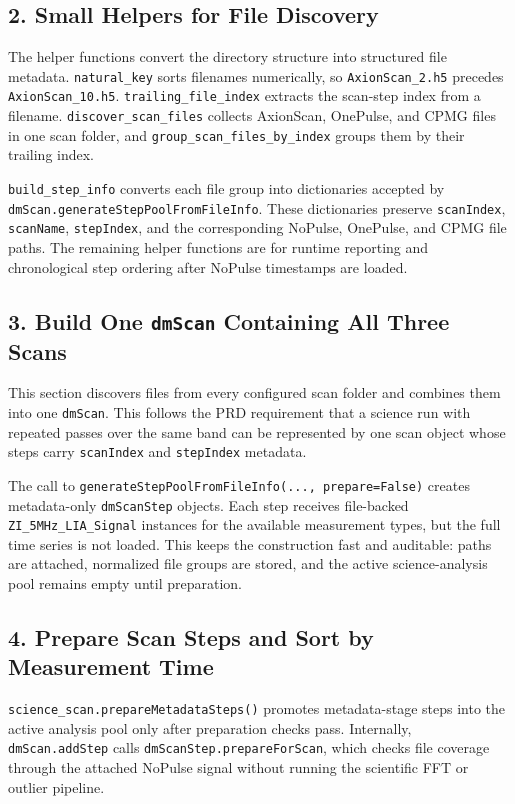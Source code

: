 \documentclass[11pt]{article}
\newcommand{\code}[1]{\texttt{#1}}
\begin{document}
\subsection{2. Small Helpers for File Discovery}

The helper functions convert the directory structure into structured file
metadata. \code{natural\_key} sorts filenames numerically, so
\code{AxionScan\_2.h5} precedes \code{AxionScan\_10.h5}. \code{trailing\_file\_index}
extracts the scan-step index from a filename. \code{discover\_scan\_files}
collects AxionScan, OnePulse, and CPMG files in one scan folder, and
\code{group\_scan\_files\_by\_index} groups them by their trailing index.

\code{build\_step\_info} converts each file group into dictionaries accepted by
\code{dmScan.generateStepPoolFromFileInfo}. These dictionaries preserve
\code{scanIndex}, \code{scanName}, \code{stepIndex}, and the corresponding
NoPulse, OnePulse, and CPMG file paths. The remaining helper functions are for
runtime reporting and chronological step ordering after NoPulse timestamps are
loaded.

\subsection{3. Build One \code{dmScan} Containing All Three Scans}

This section discovers files from every configured scan folder and combines
them into one \code{dmScan}. This follows the PRD requirement that a science run
with repeated passes over the same band can be represented by one scan object
whose steps carry \code{scanIndex} and \code{stepIndex} metadata.

The call to \code{generateStepPoolFromFileInfo(..., prepare=False)} creates
metadata-only \code{dmScanStep} objects. Each step receives file-backed
\code{ZI\_5MHz\_LIA\_Signal} instances for the available measurement types, but
the full time series is not loaded. This keeps the construction fast and
auditable: paths are attached, normalized file groups are stored, and the
active science-analysis pool remains empty until preparation.

\subsection{4. Prepare Scan Steps and Sort by Measurement Time}

\code{science\_scan.prepareMetadataSteps()} promotes metadata-stage steps into
the active analysis pool only after preparation checks pass. Internally,
\code{dmScan.addStep} calls \code{dmScanStep.prepareForScan}, which checks file
coverage through the attached NoPulse signal without running the scientific
FFT or outlier pipeline.
\end{document}

